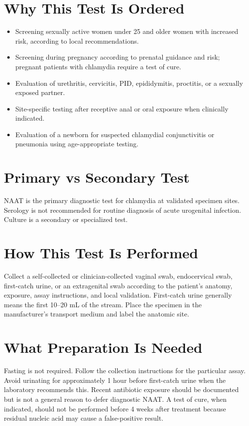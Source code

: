 \section*{Why This Test Is Ordered}
\begin{itemize}
  \item Screening sexually active women under 25 and older women with increased risk, according to local recommendations.
  \item Screening during pregnancy according to prenatal guidance and risk; pregnant patients with chlamydia require a test of cure.
  \item Evaluation of urethritis, cervicitis, PID, epididymitis, proctitis, or a sexually exposed partner.
  \item Site-specific testing after receptive anal or oral exposure when clinically indicated.
  \item Evaluation of a newborn for suspected chlamydial conjunctivitis or pneumonia using age-appropriate testing.
\end{itemize}

\section*{Primary vs Secondary Test}
NAAT is the primary diagnostic test for chlamydia at validated specimen sites. Serology is not recommended for routine diagnosis of acute urogenital infection. Culture is a secondary or specialized test.

\section*{How This Test Is Performed}
Collect a self-collected or clinician-collected vaginal swab, endocervical swab, first-catch urine, or an extragenital swab according to the patient's anatomy, exposure, assay instructions, and local validation. First-catch urine generally means the first 10--20 mL of the stream. Place the specimen in the manufacturer's transport medium and label the anatomic site.

\section*{What Preparation Is Needed}
Fasting is not required. Follow the collection instructions for the particular assay. Avoid urinating for approximately 1 hour before first-catch urine when the laboratory recommends this. Recent antibiotic exposure should be documented but is not a general reason to defer diagnostic NAAT. A test of cure, when indicated, should not be performed before 4 weeks after treatment because residual nucleic acid may cause a false-positive result.

